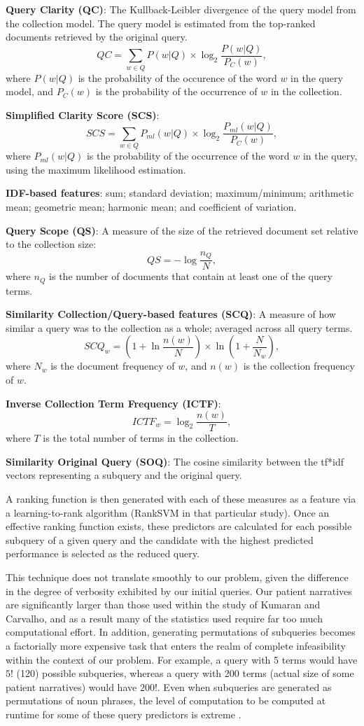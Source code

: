 \documentclass[a4paper]{report}
\begin{document}
\textbf{Query Clarity (QC)}:
The Kullback-Leibler divergence of the query model from the collection model. The query model is estimated from the top-ranked documents retrieved by the original query. 
$$QC = \sum_{w\in Q} P(w|Q) \times \log_2{\frac{P(w|Q)}{P_C(w)}},$$ where $P(w|Q)$ is the probability of the occurence of the word $w$ in the query model, and $P_C(w)$ is the probability of the occurrence of $w$ in the collection.


\textbf{Simplified Clarity Score (SCS)}:
$$SCS = \sum_{w\in Q} P_{ml}(w|Q) \times \log_2{\frac{P_{ml}(w|Q)}{P_C(w)}},$$ 
where $P_{ml}(w|Q)$ is the probability of the occurrence of the word $w$ in the query, using the maximum likelihood estimation.

\textbf{IDF-based features}:
sum; standard deviation; maximum/minimum; arithmetic mean; geometric mean; harmonic mean; and coefficient of variation.

\textbf{Query Scope (QS)}:
A measure of the size of the retrieved document set relative to the collection size:
$$QS = -\log{\frac{n_Q}{N}},$$ 
where $n_Q$ is the number of documents that contain at least one of the query terms.

\textbf{Similarity Collection/Query-based features (SCQ)}:
A measure of how similar a query was to the collection as a whole; averaged across all query terms.
$$SCQ_w = (1+ \ln{\frac{n(w)}{N}}) \times \ln{(1 + \frac{N}{N_w})},$$
where $N_w$ is the document frequency of $w$, and $n(w)$ is the collection frequency of $w$. 

\textbf{Inverse Collection Term Frequency (ICTF)}:
$$ICTF_w = \log_2{\frac{n(w)}{T}},$$
where $T$ is the total number of terms in the collection.

\textbf{Similarity Original Query (SOQ)}:
The cosine similarity between the tf*idf vectors representing a subquery and the original query.

A ranking function is then generated with each of these measures as a feature via a learning-to-rank algorithm (RankSVM in that particular study). Once an effective ranking function exists, these predictors are calculated for each possible subquery of a given query and the candidate with the highest predicted performance is selected as the reduced query.

This technique does not translate smoothly to our problem, given the difference in the degree of verbosity exhibited by our initial queries. Our patient narratives are significantly larger than those used within the study of Kumaran and Carvalho, and as a result many of the statistics used require far too much computational effort. In addition, generating permutations of subqueries becomes a factorially more expensive task that enters the realm of complete infeasibility within the context of our problem. For example, a query with 5 terms would have $5!$ (120) possible subqueries, whereas a query with 200 terms (actual size of some patient narratives) would have $200!$. Even when subqueries are generated as permutations of noun phrases, the level of computation to be computed at runtime for some of these query predictors is extreme \cite{koopman2017generating}.
\end{document}
